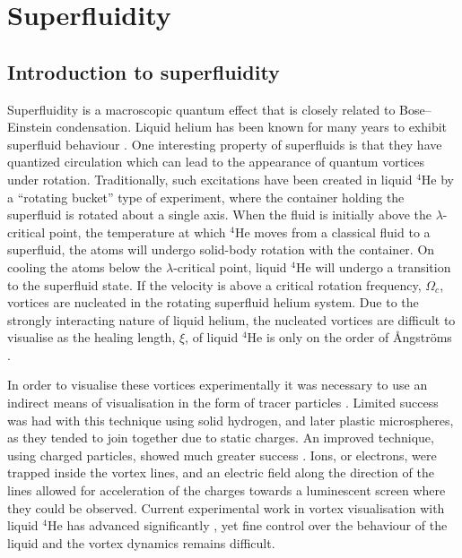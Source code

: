 \section{Superfluidity}\label{sec:superfluid}
\subsection{Introduction to superfluidity}\label{sec:intro_super}

Superfluidity is a macroscopic quantum effect that is closely related to Bose--Einstein condensation. Liquid helium has been known for many years to exhibit superfluid behaviour \cite{BEC:Penrose_pr_1956}. One interesting property of superfluids is that they have quantized circulation which can lead to the appearance of quantum vortices under rotation. Traditionally, such excitations have been created in liquid $^4$He by a ``rotating bucket'' type of experiment, where the container holding the superfluid is rotated about a single axis. When the fluid is initially above the $\lambda$-critical point, the temperature at which $^4$He moves from a classical fluid to a superfluid, the atoms will undergo solid-body rotation with the container. On cooling the atoms below the $\lambda$-critical point, liquid $^4$He will undergo a transition to the superfluid state. If the velocity is above a critical rotation frequency, $\Omega_c$, vortices are nucleated in the rotating superfluid helium system. Due to the strongly interacting nature of liquid helium, the nucleated vortices are difficult to visualise as the healing length, $\xi$, of liquid $^4$He is only on the order of {\r{A}}ngstr{\"o}ms \cite{BEC:Srinivasen_pramana_2006}.

In order to visualise these vortices experimentally it was necessary to use an indirect means of visualisation in the form of tracer particles \cite{BEC:Packard_physb_1982}. Limited success was had with this technique using solid hydrogen, and later plastic microspheres, as they tended to join together due to static charges. An improved technique, using charged particles, showed much greater success \cite{Vtx:Packard_prl_1969}. Ions, or electrons, were trapped inside the vortex lines, and an electric field along the direction of the lines allowed for acceleration of the charges towards a luminescent screen where they could be observed. Current experimental work in vortex visualisation with liquid $^4$He has advanced significantly \cite{Vtx:Tsubota_arxiv_2010,Vtx:Guo_pnas_2014}, yet fine control over the behaviour of the liquid and the vortex dynamics remains difficult.

